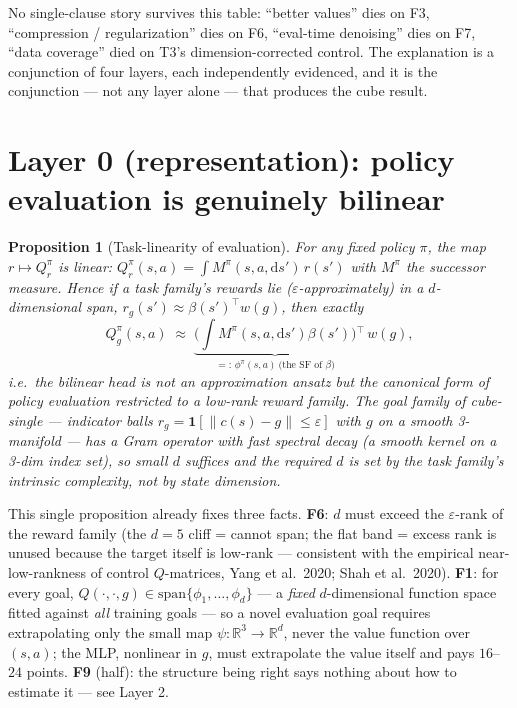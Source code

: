 \documentclass[11pt]{article}
\newcommand{\R}{\mathbb{R}}
\newtheorem{proposition}{Proposition}
\theoremstyle{definition}
\theoremstyle{remark}
\begin{document}
No single-clause story survives this table: ``better values'' dies on F3, ``compression /
regularization'' dies on F6, ``eval-time denoising'' dies on F7, ``data coverage'' died on
T3's dimension-corrected control. The explanation is a conjunction of four layers, each
independently evidenced, and it is the conjunction --- not any layer alone --- that produces
the cube result.

\section{Layer 0 (representation): policy evaluation is genuinely bilinear}
\label{sec:layer0}

\begin{proposition}[Task-linearity of evaluation]\label{prop:linearity}
For any fixed policy $\pi$, the map $r\mapsto Q^\pi_r$ is linear:
$Q^\pi_r(s,a)=\int M^\pi(s,a,\mathrm ds')\,r(s')$ with $M^\pi$ the successor measure. Hence
if a task family's rewards lie ($\varepsilon$-approximately) in a $d$-dimensional span,
$r_g(s')\approx\beta(s')^\top w(g)$, then \emph{exactly}
\begin{equation}
Q^\pi_g(s,a)\;\approx\;\underbrace{\Big(\textstyle\int M^\pi(s,a,\mathrm
ds')\beta(s')\Big)}_{=:\,\phi^\pi(s,a)\ \text{(the SF of }\beta\text{)}}{}^{\top}\,w(g),
\label{eq:sf}
\end{equation}
i.e.\ the bilinear head is not an approximation \emph{ansatz} but the \emph{canonical form}
of policy evaluation restricted to a low-rank reward family. The goal family of cube-single
--- indicator balls $r_g=\mathbf 1[\|c(s)-g\|\le\varepsilon]$ with $g$ on a smooth
3-manifold --- has a Gram operator with fast spectral decay (a smooth kernel on a 3-dim
index set), so small $d$ suffices and the required $d$ is set by the task family's intrinsic
complexity, not by state dimension.
\end{proposition}

This single proposition already fixes three facts. \textbf{F6}: $d$ must exceed the
$\varepsilon$-rank of the reward family (the $d{=}5$ cliff = cannot span; the flat band =
excess rank is unused because the target itself is low-rank --- consistent with the empirical
near-low-rankness of control $Q$-matrices, Yang et al.\ 2020; Shah et al.\ 2020).
\textbf{F1}: for every goal, $Q(\cdot,\cdot,g)\in\mathrm{span}\{\phi_1,\dots,\phi_d\}$ ---
a \emph{fixed} $d$-dimensional function space fitted against \emph{all} training goals --- so
a novel evaluation goal requires extrapolating only the small map $\psi:\R^3\to\R^d$, never
the value function over $(s,a)$; the MLP, nonlinear in $g$, must extrapolate the value
itself and pays $16$--$24$ points. \textbf{F9} (half): the structure being right says
nothing about how to estimate it --- see Layer 2.
\end{document}
